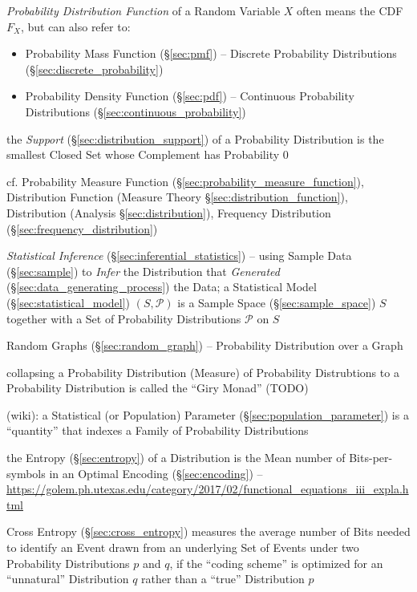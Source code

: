 \emph{Probability Distribution Function} of a Random Variable $X$ often means
the CDF $F_X$, but can also refer
to:
\begin{itemize}
  \item Probability Mass Function (\S\ref{sec:pmf}) -- Discrete Probability
    Distributions (\S\ref{sec:discrete_probability})
  \item Probability Density Function (\S\ref{sec:pdf}) -- Continuous Probability
    Distributions (\S\ref{sec:continuous_probability})
\end{itemize}

the \emph{Support} (\S\ref{sec:distribution_support}) of a Probability
Distribution is the smallest Closed Set whose Complement has Probability $0$

\fist cf. Probability Measure Function
(\S\ref{sec:probability_measure_function}), Distribution Function (Measure
Theory \S\ref{sec:distribution_function}), Distribution (Analysis
\S\ref{sec:distribution}), Frequency Distribution
(\S\ref{sec:frequency_distribution})

\fist \emph{Statistical Inference} (\S\ref{sec:inferential_statistics}) -- using
Sample Data (\S\ref{sec:sample}) to \emph{Infer} the Distribution that
\emph{Generated} (\S\ref{sec:data_generating_process}) the Data; a Statistical
Model (\S\ref{sec:statistical_model}) $(S,\mathcal{P})$ is a Sample Space
(\S\ref{sec:sample_space}) $S$ together with a Set of Probability Distributions
$\mathcal{P}$ on $S$

\fist Random Graphs (\S\ref{sec:random_graph}) -- Probability Distribution over
a Graph

collapsing a Probability Distribution (Measure) of Probability Distrubtions to a
Probability Distribution is called the ``Giry Monad'' (TODO)

(wiki): a Statistical (or Population) Parameter
(\S\ref{sec:population_parameter}) is a ``quantity'' that indexes a Family of
Probability Distributions

the Entropy (\S\ref{sec:entropy}) of a Distribution is the Mean number
of Bits-per-symbols in an Optimal Encoding (\S\ref{sec:encoding}) --
\url{https://golem.ph.utexas.edu/category/2017/02/functional_equations_iii_expla.html}

Cross Entropy (\S\ref{sec:cross_entropy}) measures the average number of Bits
needed to identify an Event drawn from an underlying Set of Events under two
Probability Distributions $p$ and $q$, if the ``coding scheme'' is optimized for
an ``unnatural'' Distribution $q$ rather than a ``true'' Distribution $p$

